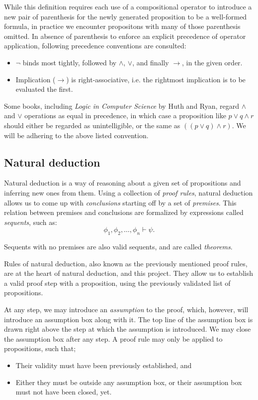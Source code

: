 \documentclass{article}
\newcommand{\imp}{\ensuremath{\rightarrow}}
\begin{document}
While this definition requires each use of a compositional operator
to introduce a new pair of parenthesis for the newly generated
proposition to be a well-formed formula, in practice we encounter
propositons with many of those parenthesis omitted. In absence of
parenthesis to enforce an explicit precedence of operator application,
following precedence conventions are consulted:

\begin{itemize}
	\item $\neg$ binds most tightly, followed by $\land$, $\lor$, and
		finally $\imp$, in the given order.
	\item Implication ($\imp$) is right-associative, i.e. the
		rightmost implication is to be evaluated the first.
\end{itemize}

Some books, including \textit{Logic in Computer Science} by Huth and Ryan,
regard $\land$ and $\lor$ operations as equal in precedence, in which
case a proposition like $p \lor q \land r$ should either be regarded
as unintelligible, or the same as $((p \lor q) \land r)$.
We will be adhering to the above listed convention.

\subsection{Natural deduction}

Natural deduction is a way of reasoning about a given set of propositions
and inferring new ones from them. Using a collection of \textit{proof rules},
natural deduction allows us to come up with \textit{conclusions} starting
off by a set of \textit{premises}. This relation between premises and
conclusions are formalized by expressions called \textit{sequents},
such as:
$$
\phi_1, \phi_2, \dotsc, \phi_n \vdash \psi.
$$

Sequents with no premises are also valid sequents, and are called
\textit{theorems}.

Rules of natural deduction, also known as the previously mentioned
proof rules, are at the heart of natural deduction, and this project.
They allow us to establish a valid proof step with a proposition,
using the previously validated list of propositions.

At any step, we may introduce an \textit{assumption} to the proof,
which, however, will introduce an assumption box along with it.
The top line of the assumption box is drawn right above the step
at which the assumption is introduced. We may close the assumption
box after any step. A proof rule may only be applied to propositions,
such that;
\begin{itemize}
	\item Their validity must have been previously established, and
	\item Either they must be outside any assumption box, or their
		assumption box must not have been closed, yet.
\end{itemize}
\end{document}
